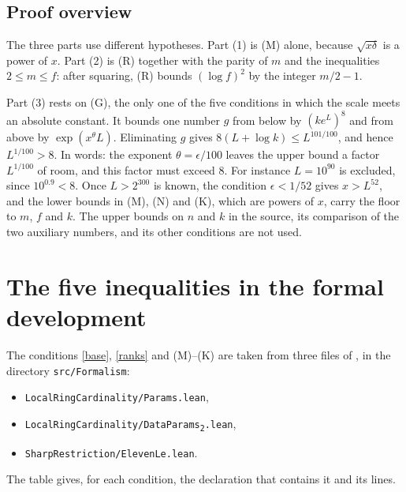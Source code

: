 \documentclass[11pt]{amsart}
\theoremstyle{definition}
\theoremstyle{remark}
\newcommand{\src}[1]{\texttt{#1}}
\newcommand{\tagM}{\textup{(M)}}
\newcommand{\tagR}{\textup{(R)}}
\newcommand{\tagG}{\textup{(G)}}
\newcommand{\tagN}{\textup{(N)}}
\newcommand{\tagK}{\textup{(K)}}
\begin{document}
\subsection{Proof overview}
The three parts use different hypotheses. Part (1) is \tagM{} alone, because $\sqrt{x\delta}$ is a power of $x$. Part (2) is \tagR{} together with the parity of $m$ and the inequalities $2\le m\le f$: after squaring, \tagR{} bounds $(\log f)^2$ by the integer $m/2-1$.

Part (3) rests on \tagG, the only one of the five conditions in which the scale meets an absolute constant. It bounds one number $g$ from below by $(ke^{L})^{8}$ and from above by $\exp(x^{\theta}L)$. Eliminating $g$ gives $8(L+\log k)\le L^{101/100}$, and hence $L^{1/100}>8$. In words: the exponent $\theta=\epsilon/100$ leaves the upper bound a factor $L^{1/100}$ of room, and this factor must exceed $8$. For instance $L=10^{90}$ is excluded, since $10^{0.9}<8$. Once $L>2^{300}$ is known, the condition $\epsilon<1/52$ gives $x>L^{52}$, and the lower bounds in \tagM, \tagN{} and \tagK, which are powers of $x$, carry the floor to $m$, $f$ and $k$. The upper bounds on $n$ and $k$ in the source, its comparison of the two auxiliary numbers, and its other conditions are not used.

\section{The five inequalities in the formal development}\label{sec:source}

The conditions \eqref{base}, \eqref{ranks} and \tagM--\tagK{} are taken from three files of \cite{archive}, in the directory \src{src/Formalism}:
\begin{itemize}
\item[\src{P}] \src{LocalRingCardinality/Params.lean},
\item[\src{D}] \src{LocalRingCardinality/DataParams\textsubscript{2}.lean},
\item[\src{E}] \src{SharpRestriction/ElevenLe.lean}.
\end{itemize}
The table gives, for each condition, the declaration that contains it and its lines.
\end{document}

